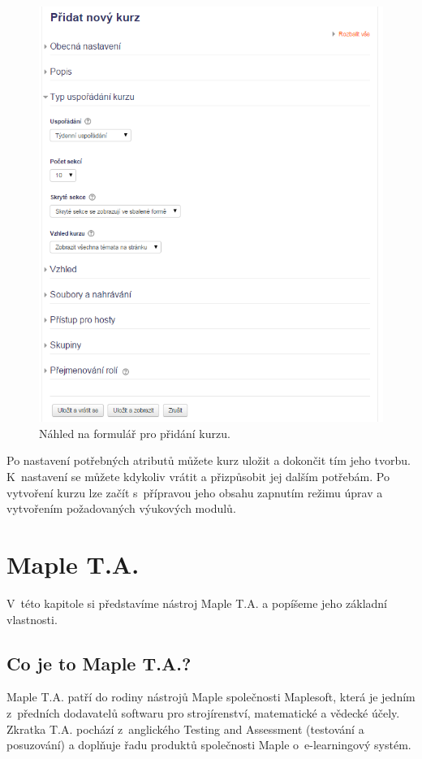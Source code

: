 \documentclass[
print,
  11pt,
  table,   
  nolof,    
  nolot,
  oneside,final
]{fithesis3}
\begin{document}
		\begin{figure}
		  \begin{center}
		    \includegraphics[width=120mm]{images/kurzy-pridani-detail.png}
		   \end{center}
		  \caption{Náhled na formulář pro přidání kurzu.}
		  \label{fig:moodlekurzypridanidetail}
		\end{figure}

Po nastavení potřebných atributů můžete kurz uložit a dokončit tím jeho tvorbu. K~nastavení se můžete kdykoliv vrátit a přizpůsobit jej dalším potřebám. Po vytvoření kurzu lze začít s~přípravou jeho obsahu zapnutím režimu úprav a vytvořením požadovaných výukových modulů.


\chapter{Maple T.A.}
V~této kapitole si představíme nástroj Maple T.A. a popíšeme jeho základní vlastnosti.
	\section{Co je to Maple T.A.?}
Maple T.A. patří do rodiny nástrojů Maple společnosti Maplesoft, která je jedním z~předních dodavatelů softwaru pro strojírenství, matematické a vědecké účely. Zkratka T.A. pochází z~anglického Testing and Assessment (testování a posuzování) a doplňuje řadu produktů společnosti Maple o~e-learn\-ingový systém.
\end{document}
